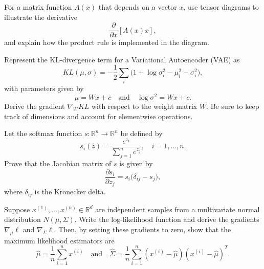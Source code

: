 \begin{exercise}
   For a matrix function $A(x)$ that depends on a vector $x$, use tensor diagrams to illustrate the derivative 
   \[
      \frac{\partial}{\partial x}[A(x)x],
   \]
   and explain how the product rule is implemented in the diagram.
\end{exercise}

\begin{exercise}
   Represent the KL-divergence term for a Variational Autoencoder (VAE) as
   \[
      KL(\mu,\sigma) = -\frac{1}{2}\sum_i\Big(1 + \log\sigma_i^2 - \mu_i^2 - \sigma_i^2\Big),
   \]
   with parameters given by 
   \[
      \mu = W x + c \quad \text{and} \quad \log\sigma^2 = W x + c.
   \]
   Derive the gradient $\nabla_W KL$ with respect to the weight matrix $W$. Be sure to keep track of dimensions and account for elementwise operations.
\end{exercise}
\begin{exercise}
   Let the softmax function $s:\mathbb{R}^n \to \mathbb{R}^n$ be defined by
   \[
      s_i(z) = \frac{e^{z_i}}{\sum_{j=1}^n e^{z_j}}, \quad i=1,\dots,n.
   \]
   Prove that the Jacobian matrix of $s$ is given by
   \[
      \frac{\partial s_i}{\partial z_j} = s_i\big(\delta_{ij} - s_j\big),
   \]
   where $\delta_{ij}$ is the Kronecker delta.
\end{exercise}

\begin{exercise}
   Suppose $x^{(1)},\dots,x^{(n)} \in \mathbb{R}^d$ are independent samples from a multivariate normal distribution $N(\mu,\Sigma)$. Write the log-likelihood function and derive the gradients $\nabla_\mu \ell$ and $\nabla_\Sigma \ell$. Then, by setting these gradients to zero, show that the maximum likelihood estimators are
   \[
      \hat\mu = \frac{1}{n}\sum_{i=1}^n x^{(i)} \quad \text{and} \quad \hat\Sigma = \frac{1}{n}\sum_{i=1}^n (x^{(i)} - \hat\mu)(x^{(i)} - \hat\mu)^T.
   \]
\end{exercise}


